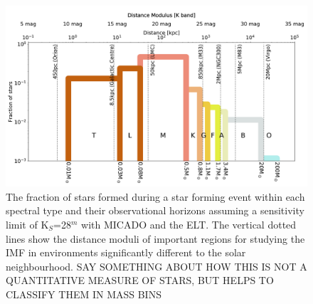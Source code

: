 \begin{figure}

    \centering
    \includegraphics[width=\textwidth]{images/imf_educational.pdf}

    \caption{The fraction of stars formed during a star forming event within each spectral type and their observational horizons assuming a sensitivity limit of K$_S$=28$^m$ with MICADO and the ELT. 
    The vertical dotted lines show the distance moduli of important regions for studying the IMF in environments significantly different to the solar neighbourhood.
    \rewrite SAY SOMETHING ABOUT HOW THIS IS NOT A QUANTITATIVE MEASURE OF STARS, BUT HELPS TO CLASSIFY THEM IN MASS BINS
    }
    
    \label{fig:imf_educational}
    
\end{figure}


